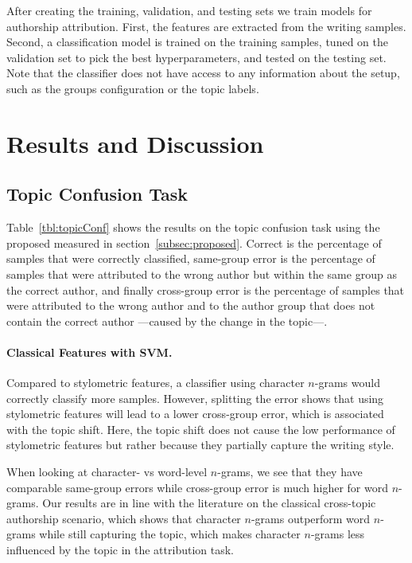 \documentclass[11pt]{article}
\begin{document}
After creating the training, validation, and testing sets we train models for authorship attribution. First, the features are extracted from the writing samples. Second, a classification model is trained on the training samples, tuned on the validation set to pick the best hyperparameters, and tested on the testing set. Note that the classifier does not have access to any information about the setup, such as the groups configuration or the topic labels. 


\section{Results and Discussion}
\subsection{Topic Confusion Task}
Table~\ref{tbl:topicConf} shows the results on the topic confusion task using the proposed measured in section~\ref{subsec:proposed}. Correct is the percentage of samples that were correctly classified, same-group error is the percentage of samples that were attributed to the wrong author but within the same group as the correct author, and finally cross-group error is the percentage of samples that were attributed to the wrong author and to the author group that does not contain the correct author ---caused by the change in the topic---. 

\paragraph{Classical Features with SVM.}
Compared to stylometric features, a classifier using character $n$-grams would correctly classify more samples. However, splitting the error shows that using stylometric features will lead to a lower cross-group error, which is associated with the topic shift. Here, the topic shift does not cause the low performance of stylometric features but rather because they partially capture the writing style.

When looking at character- vs word-level $n$-grams, we see that they have comparable same-group errors while cross-group error is much higher for word $n$-grams. Our results are in line with the literature on the classical cross-topic authorship scenario, which shows that character $n$-grams outperform word $n$-grams while still capturing the topic, which makes character $n$-grams less influenced by the topic in the attribution task.

\end{document}

